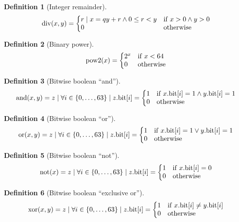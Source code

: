 \documentclass[a4paper,10pt]{article}
\newcommand{\bitno}[2]{#1.\mathrm{bit}[#2]}
\newcommand{\range}[2]{\{#1,\ldots,#2\}}
\DeclareMathOperator{\Div}{div}
\DeclareMathOperator{\BinPow}{pow2}
\DeclareMathOperator{\BitAnd}{and}
\DeclareMathOperator{\BitOr}{or}
\DeclareMathOperator{\BitNot}{not}
\DeclareMathOperator{\BitXor}{xor}
\theoremstyle{definition}
\newtheorem{definition}{Definition}
\begin{document}
\begin{definition}[Integer remainder]
  \[ \Div(x, y) =
    \left\{
      \begin{array}{@{}ll@{}}
        r \mid x = qy + r \wedge 0 \leq r < y & \mathrm{if} \; x > 0 \wedge y > 0 \\
        0 & \textrm{otherwise}
      \end{array}
    \right. \]
\end{definition}

\begin{definition}[Binary power]
  \[ \BinPow(x) =
    \left\{
      \begin{array}{@{}ll@{}}
        2^x & \mathrm{if} \; x < 64 \\
        0   & \textrm{otherwise}
      \end{array}
    \right. \]
\end{definition}

\begin{definition}[Bitwise boolean ``and'']
  \[ \BitAnd(x, y) = z \mid
    \forall i \in \range{0}{63} \mid \bitno{z}{i} = \left\{
      \begin{array}{@{}ll@{}}
        1 & \mathrm{if} \; \bitno{x}{i} = 1 \wedge \bitno{y}{i} = 1 \\
        0 & \mathrm{otherwise}
      \end{array}
    \right. \]
\end{definition}

\begin{definition}[Bitwise boolean ``or'']
  \[ \BitOr(x, y) = z \mid
    \forall i \in \range{0}{63} \mid \bitno{z}{i} = \left\{
      \begin{array}{@{}ll@{}}
        1 & \mathrm{if} \; \bitno{x}{i} = 1 \vee \bitno{y}{i} = 1 \\
        0 & \mathrm{otherwise}
      \end{array}
    \right. \]
\end{definition}

\begin{definition}[Bitwise boolean ``not'']
  \[ \BitNot(x) = z \mid
    \forall i \in \range{0}{63} \mid \bitno{z}{i} = \left\{
      \begin{array}{@{}ll@{}}
        1 & \mathrm{if} \; \bitno{x}{i} = 0 \\
        0 & \mathrm{otherwise}
      \end{array}
    \right. \]
\end{definition}

\begin{definition}[Bitwise boolean ``exclusive or'']
  \[ \BitXor(x, y) = z \mid
    \forall i \in \range{0}{63} \mid \bitno{z}{i} = \left\{
      \begin{array}{@{}ll@{}}
        1 & \mathrm{if} \; \bitno{x}{i} \neq \bitno{y}{i} \\
        0 & \mathrm{otherwise}
      \end{array}
    \right. \]
\end{definition}
\end{document}
